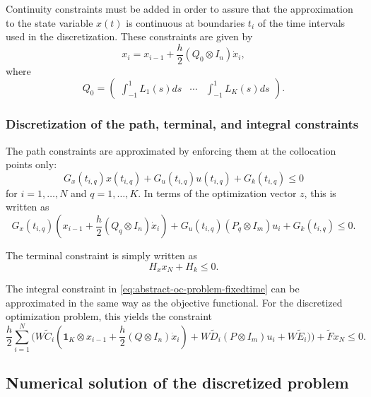 \documentclass[a4paper,11pt,DIV12]{scrartcl}
\theoremstyle{remark}
\renewcommand{\matrix}[1]{\begin{pmatrix}#1\end{pmatrix}}
\begin{document}
Continuity constraints must be added in order to assure that the approximation to the state variable $x(t)$ is continuous at boundaries $t_i$ of the time intervals used in the discretization.
These constraints are given by
\begin{equation}
  \label{eq:continuity-collocation}
  x_i = x_{i-1} + \frac{h}{2} (Q_0 \otimes I_n) \dot x_i,
\end{equation}
where
\begin{equation}
  Q_0 = \matrix{\int_{-1}^1 L_1(s) ds & \cdots & \int_{-1}^1 L_K(s) ds}.
\end{equation}

\subsubsection{Discretization of the path, terminal, and integral constraints}
\label{sec:discr-path-constr}

The path constraints are approximated by enforcing them at the collocation points only:
\begin{equation}
  \label{eq:path-constraints-collocation}
  G_x(t_{i,q}) x(t_{i,q}) + G_u(t_{i,q}) u(t_{i,q}) + G_k(t_{i,q}) \leq 0
\end{equation}
for $i=1,\dotsc,N$ and $q=1,\dotsc,K$.
In terms of the optimization vector $z$, this is written as
\begin{equation}
  \label{eq:path-constraints-discretized}
  G_x(t_{i,q}) (x_{i-1} + \frac{h}{2} (Q_q \otimes I_n) \dot x_i) + G_u(t_{i,q}) (P_q \otimes I_m) u_i + G_k(t_{i,q}) \leq 0.
\end{equation}

The terminal constraint is simply written as
\begin{equation}
  \label{eq:terminal-constraint-discretized}
  H_x x_N + H_k \leq 0.
\end{equation}

The integral constraint in \eqref{eq:abstract-oc-problem-fixedtime} can be approximated in the same way as the objective functional.
For the discretized optimization problem, this yields the constraint
\begin{equation}
  \label{eq:integral-constraint-discretized}
  \frac{h}{2} \sum_{i=1}^{N} \bigl(W \tilde C_i (\textbf{1}_K \otimes x_{i-1} + \frac{h}{2} (Q \otimes I_n) \dot x_i) + W \tilde D_i (P \otimes I_m) u_i + W \tilde E_i) \bigr) + \tilde F x_N \leq 0.
\end{equation}

\subsection{Numerical solution of the discretized problem}
\label{sec:numer-solut-discr}
\end{document}
